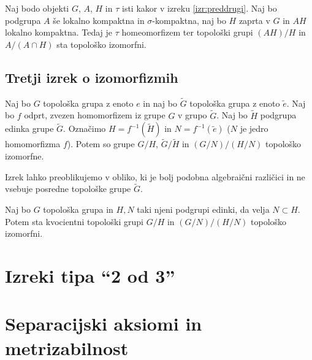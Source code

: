 \documentclass[mat1]{fmfdelo}
\begin{document}
\begin{izrek}\label{izr:drugitopizrek}
Naj bodo objekti $G$, $A$, $H$ in $\tau$ isti kakor v izreku \ref{izr:preddrugi}. Naj bo podgrupa $A$ še lokalno kompaktna in $\sigma$-kompaktna, naj bo $H$ zaprta v $G$ in $AH$ lokalno kompaktna. Tedaj je $\tau$ homeomorfizem ter topološki grupi $(AH)/H$ in $A/(A \cap H)$ sta topološko izomorfni.
\end{izrek}


\subsection{Tretji izrek o izomorfizmih}
\begin{izrek}\label{izr:predtretji}
Naj bo $G$ topološka grupa z enoto $e$ in naj bo $\widetilde{G}$ topološka grupa z enoto $\tilde{e}$. Naj bo $f$ odprt, zvezen homomorfizem iz grupe $G$ v grupo $\widetilde{G}$. Naj bo $\widetilde{H}$ podgrupa edinka grupe $\widetilde{G}$. Označimo $H = f^{-1}(\widetilde{H})$ in $N = f^{-1}(\tilde{e})$ ($N$ je jedro homomorfizma $f$). Potem so grupe $G/H$, $\widetilde{G}/\widetilde{H}$ in $(G/N)/(H/N)$ topološko izomorfne.
\end{izrek}

Izrek lahko preoblikujemo v obliko, ki je bolj podobna algebraični različici in ne vsebuje posredne topološke grupe $\widetilde{G}$.
\begin{izrek}\label{izr:tretjitopizrek}
Naj bo $G$ topološka grupa in $H,N$ taki njeni podgrupi edinki, da velja $N \subset H$. Potem sta kvocientni topološki grupi $G/H$ in $(G/N)/(H/N)$ topološko izomorfni.
\end{izrek}

\section{Izreki tipa ``2 od 3''}

\section{Separacijski aksiomi in metrizabilnost}
\end{document}
